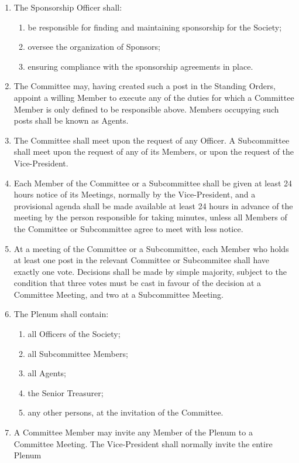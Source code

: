 \documentclass{article}
\begin{document}
\begin{enumerate}
\begin{enumerate}
	\end{enumerate}
\item The Sponsorship Officer shall:
	\begin{enumerate}
		\item be responsible for finding and maintaining sponsorship for the Society;
		\item oversee the organization of Sponsors;
		\item ensuring compliance with the sponsorship agreements in place.
	\end{enumerate}
\item The Committee may, having created such a post in the Standing Orders,
appoint a willing Member to execute any of the duties for which a Committee Member is only defined to be responsible above. Members occupying
such posts shall be known as Agents.
\item The Committee shall meet upon the request of any Officer. A Subcommittee shall meet upon the request of any of its Members, or upon the
request of the Vice-President.
\item Each Member of the Committee or a Subcommittee shall be given at
least 24 hours notice of its Meetings, normally by the Vice-President,
and a provisional agenda shall be made available at least 24 hours in
advance of the meeting by the person responsible for taking minutes, unless
all Members of the Committee or Subcommittee agree to meet with less
notice.
\item At a meeting of the Committee or a Subcommittee, each Member who
holds at least one post in the relevant Committee or Subcommitee shall
have exactly one vote. Decisions shall be made by simple majority, subject
to the condition that three votes must be cast in favour of the decision at
a Committee Meeting, and two at a Subcommittee Meeting.
\item The Plenum shall contain:
  \begin{enumerate}
  \item all Officers of the Society;
  \item all Subcommittee Members;
  \item all Agents;
  \item the Senior Treasurer;
  \item any other persons, at the invitation of the Committee.
  \end{enumerate}
\item A Committee Member may invite any Member of the Plenum to a Committee Meeting. The Vice-President shall normally invite the entire Plenum

\end{enumerate}
\end{document}
